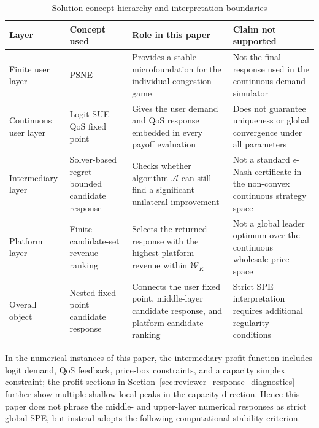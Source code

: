 \documentclass[11pt,a4paper]{article}
\begin{document}
\begin{table}[H]
\centering
\caption{Solution-concept hierarchy and interpretation boundaries}
\label{tab:solution_concept_hierarchy}
\small
\begin{tabular}{@{}>{\raggedright\arraybackslash}p{}>{\raggedright\arraybackslash}p{}>{\raggedright\arraybackslash}p{}>{\raggedright\arraybackslash}p{}@{}}
\toprule
Layer & Concept used & Role in this paper & Claim not supported \\
\midrule
Finite user layer & PSNE & Provides a stable microfoundation for the individual congestion game & Not the final response used in the continuous-demand simulator \\
Continuous user layer & Logit SUE--QoS fixed point & Gives the user demand and QoS response embedded in every payoff evaluation & Does not guarantee uniqueness or global convergence under all parameters \\
Intermediary layer & Solver-based regret-bounded candidate response & Checks whether algorithm $\mathcal{A}$ can still find a significant unilateral improvement & Not a standard $\epsilon$-Nash certificate in the non-convex continuous strategy space \\
Platform layer & Finite candidate-set revenue ranking & Selects the returned response with the highest platform revenue within $\mathcal{W}_K$ & Not a global leader optimum over the continuous wholesale-price space \\
Overall object & Nested fixed-point candidate response & Connects the user fixed point, middle-layer candidate response, and platform candidate ranking & Strict SPE interpretation requires additional regularity conditions \\
\bottomrule
\end{tabular}
\end{table}

In the numerical instances of this paper, the intermediary profit function includes logit demand, QoS feedback, price-box constraints, and a capacity simplex constraint; the profit sections in Section~\ref{sec:reviewer_response_diagnostics} further show multiple shallow local peaks in the capacity direction. Hence this paper does not phrase the middle- and upper-layer numerical responses as strict global SPE, but instead adopts the following computational stability criterion.
\end{document}
